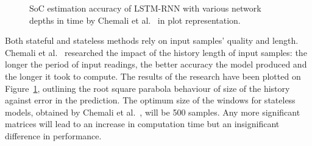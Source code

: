 %
\begin{figure}[htbp]
    \centering
    
    \caption{SoC estimation accuracy of LSTM-RNN with various network depths in time by Chemali et al.~\cite{Chemali2017} in plot representation.}
    \label{fig:chemali-accuracy}
\end{figure}
 {
    
} {
    Both stateful and stateless methods rely on input samples' quality and length.
    Chemali et al.~\cite{Chemali2017} researched the impact of the history length of input samples: the longer the period of input readings, the better accuracy the model produced and the longer it took to compute.
    The results of the research have been plotted on \mbox{Figure~\ref{fig:chemali-accuracy}}, outlining the root square parabola behaviour of size of the history against error in the prediction.
    The optimum size of the windows for stateless models, obtained by Chemali et al.~\cite{Chemali2017}, will be 500 samples.
    Any more significant matrices will lead to an increase in computation time but an insignificant difference in performance.
}

